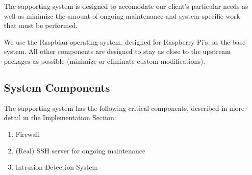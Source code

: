 The supporting system is designed to accomodate our client's particular needs
as well as minimize the amount of ongoing maintenance and system-specific work
that must be performed.

We use the Raspbian operating system, designed for Raspberry Pi's, as the base
system. All other components are designed to stay as close to the upstream
packages as possible (minimize or eliminate custom modifications).

\subsection{System Components}

The supporting system has the following critical components, described in more
detail in the Implementation Section:
\begin{enumerate}
    \item Firewall
    \item (Real) SSH server for ongoing maintenance
    \item Intrusion Detection System
\end{enumerate}
